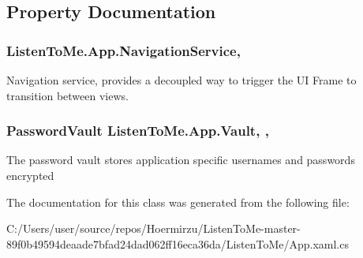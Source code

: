 \subsection{Property Documentation}
\subsubsection[{\texorpdfstring{Navigation\+Service}{NavigationService}}]{ Listen\+To\+Me.\+App.\+Navigation\+Service\hspace{0.3cm}{\ttfamily [static]}, {\ttfamily [get]}}\hypertarget{class_listen_to_me_1_1_app_ae35ddc10bf8aad1a80c92c71c6e3b7fc}{}\label{class_listen_to_me_1_1_app_ae35ddc10bf8aad1a80c92c71c6e3b7fc}


Navigation service, provides a decoupled way to trigger the UI Frame to transition between views. 

\subsubsection[{\texorpdfstring{Vault}{Vault}}]{\setlength{\rightskip}{0pt plus 5cm}Password\+Vault Listen\+To\+Me.\+App.\+Vault\hspace{0.3cm}{\ttfamily [static]}, {\ttfamily [get]}, {\ttfamily [set]}}\hypertarget{class_listen_to_me_1_1_app_ad1b3a77f44f52055446727716abfccc6}{}\label{class_listen_to_me_1_1_app_ad1b3a77f44f52055446727716abfccc6}


The password vault stores application specific usernames and passwords encrypted 



The documentation for this class was generated from the following file\+:\begin{DoxyCompactItemize}
\item 
C\+:/\+Users/user/source/repos/\+Hoermirzu/\+Listen\+To\+Me-\/master-\/89f0b49594deaade7bfad24dad062ff16eca36da/\+Listen\+To\+Me/App.\+xaml.\+cs\end{DoxyCompactItemize}
